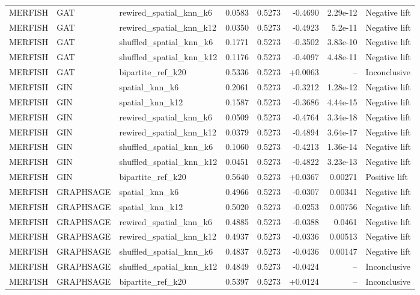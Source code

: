 \begin{longtable}{lllrrrrl}
MERFISH & GAT & rewired\_spatial\_knn\_k6 & 0.0583 & 0.5273 & -0.4690 & 2.29e-12 & Negative lift \\
MERFISH & GAT & rewired\_spatial\_knn\_k12 & 0.0350 & 0.5273 & -0.4923 & 5.2e-11 & Negative lift \\
MERFISH & GAT & shuffled\_spatial\_knn\_k6 & 0.1771 & 0.5273 & -0.3502 & 3.83e-10 & Negative lift \\
MERFISH & GAT & shuffled\_spatial\_knn\_k12 & 0.1176 & 0.5273 & -0.4097 & 4.48e-11 & Negative lift \\
MERFISH & GAT & bipartite\_ref\_k20 & 0.5336 & 0.5273 & +0.0063 & -- & Inconclusive \\
MERFISH & GIN & spatial\_knn\_k6 & 0.2061 & 0.5273 & -0.3212 & 1.28e-12 & Negative lift \\
MERFISH & GIN & spatial\_knn\_k12 & 0.1587 & 0.5273 & -0.3686 & 4.44e-15 & Negative lift \\
MERFISH & GIN & rewired\_spatial\_knn\_k6 & 0.0509 & 0.5273 & -0.4764 & 3.34e-18 & Negative lift \\
MERFISH & GIN & rewired\_spatial\_knn\_k12 & 0.0379 & 0.5273 & -0.4894 & 3.64e-17 & Negative lift \\
MERFISH & GIN & shuffled\_spatial\_knn\_k6 & 0.1060 & 0.5273 & -0.4213 & 1.36e-14 & Negative lift \\
MERFISH & GIN & shuffled\_spatial\_knn\_k12 & 0.0451 & 0.5273 & -0.4822 & 3.23e-13 & Negative lift \\
MERFISH & GIN & bipartite\_ref\_k20 & 0.5640 & 0.5273 & +0.0367 & 0.00271 & Positive lift \\
MERFISH & GRAPHSAGE & spatial\_knn\_k6 & 0.4966 & 0.5273 & -0.0307 & 0.00341 & Negative lift \\
MERFISH & GRAPHSAGE & spatial\_knn\_k12 & 0.5020 & 0.5273 & -0.0253 & 0.00756 & Negative lift \\
MERFISH & GRAPHSAGE & rewired\_spatial\_knn\_k6 & 0.4885 & 0.5273 & -0.0388 & 0.0461 & Negative lift \\
MERFISH & GRAPHSAGE & rewired\_spatial\_knn\_k12 & 0.4937 & 0.5273 & -0.0336 & 0.00513 & Negative lift \\
MERFISH & GRAPHSAGE & shuffled\_spatial\_knn\_k6 & 0.4837 & 0.5273 & -0.0436 & 0.00147 & Negative lift \\
MERFISH & GRAPHSAGE & shuffled\_spatial\_knn\_k12 & 0.4849 & 0.5273 & -0.0424 & -- & Inconclusive \\
MERFISH & GRAPHSAGE & bipartite\_ref\_k20 & 0.5397 & 0.5273 & +0.0124 & -- & Inconclusive \\

\end{longtable}
